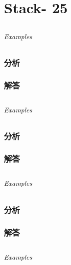\documentclass[UTF8,a4paper,12pt]{ctexbook}
\begin{document}
\chapter{Stack- 25}
\section{}
	
	\subparagraph{Examples}
	
	\subsection{分析}
	
	\subsection{解答}
	
\section{}
	
	\subparagraph{Examples}
	
	\subsection{分析}
	
	\subsection{解答}
	
\section{}
	
	\subparagraph{Examples}
	
	\subsection{分析}
	
	\subsection{解答}
	
\section{}
	
	\subparagraph{Examples}
	
\end{document}
